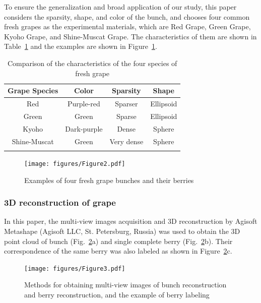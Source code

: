 \documentclass[12pt]{article}
\begin{document}
To ensure the generalization and broad application of our study, this paper considers the sparsity, shape, and color of the bunch, and chooses four common fresh grapes as the experimental materials, which are Red Grape, Green Grape, Kyoho Grape, and Shine-Muscat Grape. 
The characteristics of them are shown in Table~\ref{tbl:1} and the examples are shown in Figure~\ref{fig:raw86}.

\begin{table}[h]
    \centering
    \caption{Comparison of the characteristics of the four species of fresh grape}
    \begin{tabular}{cccc}
        \hline
        \textbf{Grape Species} & \textbf{Color} & \textbf{Sparsity} & \textbf{Shape} \\
        \hline
        Red & Purple-red & Sparser & Ellipsoid \\
        Green & Green & Sparse & Ellipsoid \\
        Kyoho & Dark-purple & Dense & Sphere \\
        Shine-Muscat & Green & Very dense & Sphere \\
        \hline
    \label{tbl:1}
    \end{tabular}
\end{table}

\begin{figure}[hbt!]
    \centering
    \texttt{[image: figures/Figure2.pdf]}
    \caption{Examples of four fresh grape bunches and their berries}
    \label{fig:raw86}
\end{figure}

\subsubsection{3D reconstruction of grape}
\label{sec:212}

In this paper, the multi-view images acquisition and 3D reconstruction by Agisoft Metashape (Agisoft LLC, St. Petersburg, Russia) was used to obtain the 3D point cloud of bunch (Fig.~\ref{fig:raw9}a) and single complete berry (Fig.~\ref{fig:raw9}b). 
Their correspondence of the same berry was also labeled as shown in Figure~\ref{fig:raw9}c.

\begin{figure}[hbt!]
    \centering
    \texttt{[image: figures/Figure3.pdf]}
    \caption{Methods for obtaining multi-view images of bunch reconstruction and berry reconstruction, and the example of berry labeling}
    \label{fig:raw9}
\end{figure}
\end{document}
